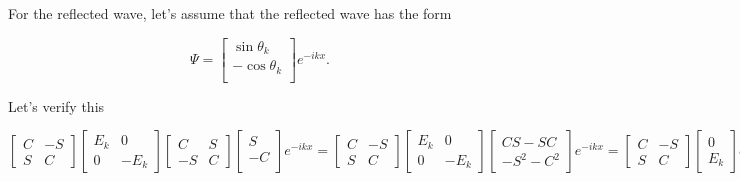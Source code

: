 {

For the reflected wave, let's assume that the reflected wave has the form

\begin{dmath}\label{eqn:qmLecture9Problems:680}
\Psi = 
\begin{bmatrix}
\sin\theta_k \\
-\cos\theta_k \\
\end{bmatrix}
e^{-i k x }.
\end{dmath}

Let's verify this 

\begin{dmath}\label{eqn:qmLecture9Problems:700}
\begin{bmatrix}
C & - S \\
S & C
\end{bmatrix}
\begin{bmatrix}
E_k & 0 \\
0 & -E_k
\end{bmatrix}
\begin{bmatrix}
C & S \\
-S & C
\end{bmatrix}
\begin{bmatrix}
S \\
-C \\
\end{bmatrix}
e^{-i k x}
=
\begin{bmatrix}
C & - S \\
S & C
\end{bmatrix}
\begin{bmatrix}
E_k & 0 \\
0 & -E_k
\end{bmatrix}
\begin{bmatrix}
C S - S C \\
-S^2 - C^2
\end{bmatrix}
e^{-i k x}
=
\begin{bmatrix}
C & - S \\
S & C
\end{bmatrix}
\begin{bmatrix}
0 \\
E_k
\end{bmatrix}
e^{-i k x}
=
E_k
\begin{bmatrix}
- S \\
C
\end{bmatrix}
e^{-i k x}
=
-E_k
\begin{bmatrix}
S \\
-C
\end{bmatrix}
e^{-i k x}.
\end{dmath}

}
